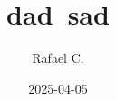 \documentclass[10pt,
 article,
 amsmath,amssymb
]{revtex4-2}
\begin{document}
\title{dad\ sad}



\author{Rafael C.}




\date{2025-04-05}







\maketitle

\tableofcontents
\end{document}
